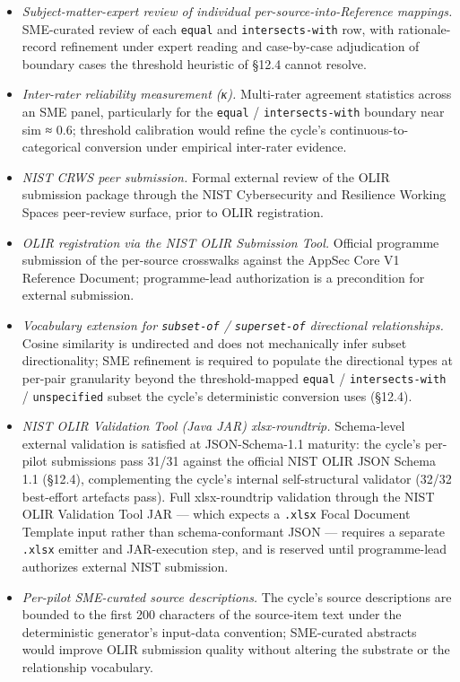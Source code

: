 \documentclass[
]{article}
\providecommand{\tightlist}{%
  \setlength{\itemsep}{0pt}\setlength{\parskip}{0pt}}
\begin{document}
\begin{itemize}
\tightlist
\item
  \emph{Subject-matter-expert review of individual
  per-source-into-Reference mappings.} SME-curated review of each
  \texttt{equal} and \texttt{intersects-with} row, with rationale-record
  refinement under expert reading and case-by-case adjudication of
  boundary cases the threshold heuristic of §12.4 cannot resolve.
\item
  \emph{Inter-rater reliability measurement (κ).} Multi-rater agreement
  statistics across an SME panel, particularly for the \texttt{equal} /
  \texttt{intersects-with} boundary near sim ≈ 0.6; threshold
  calibration would refine the cycle's continuous-to-categorical
  conversion under empirical inter-rater evidence.
\item
  \emph{NIST CRWS peer submission.} Formal external review of the OLIR
  submission package through the NIST Cybersecurity and Resilience
  Working Spaces peer-review surface, prior to OLIR registration.
\item
  \emph{OLIR registration via the NIST OLIR Submission Tool.} Official
  programme submission of the per-source crosswalks against the AppSec
  Core V1 Reference Document; programme-lead authorization is a
  precondition for external submission.
\item
  \emph{Vocabulary extension for \texttt{subset-of} /
  \texttt{superset-of} directional relationships.} Cosine similarity is
  undirected and does not mechanically infer subset directionality; SME
  refinement is required to populate the directional types at per-pair
  granularity beyond the threshold-mapped \texttt{equal} /
  \texttt{intersects-with} / \texttt{unspecified} subset the cycle's
  deterministic conversion uses (§12.4).
\item
  \emph{NIST OLIR Validation Tool (Java JAR) xlsx-roundtrip.}
  Schema-level external validation is satisfied at JSON-Schema-1.1
  maturity: the cycle's per-pilot submissions pass 31/31 against the
  official NIST OLIR JSON Schema 1.1 (§12.4), complementing the cycle's
  internal self-structural validator (32/32 best-effort artefacts pass).
  Full xlsx-roundtrip validation through the NIST OLIR Validation Tool
  JAR --- which expects a \texttt{.xlsx} Focal Document Template input
  rather than schema-conformant JSON --- requires a separate
  \texttt{.xlsx} emitter and JAR-execution step, and is reserved until
  programme-lead authorizes external NIST submission.
\item
  \emph{Per-pilot SME-curated source descriptions.} The cycle's source
  descriptions are bounded to the first 200 characters of the
  source-item text under the deterministic generator's input-data
  convention; SME-curated abstracts would improve OLIR submission
  quality without altering the substrate or the relationship vocabulary.
\end{itemize}
\end{document}
